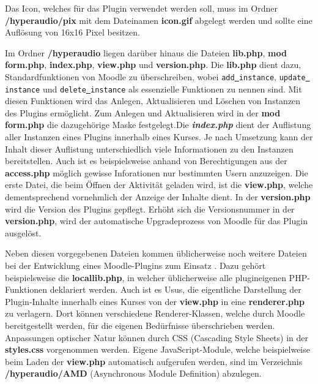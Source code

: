 Das Icon, welches für das Plugin  verwendet werden soll, muss im Ordner \textbf{/hyperaudio/pix} mit dem Dateinamen \textbf{icon.gif} abgelegt werden und sollte eine Auflösung von 16x16 Pixel besitzen.

Im Ordner \textbf{/hyperaudio} liegen darüber hinaus die Dateien \textbf{lib.php}, \textbf{mod\underline{{ }}form.php}, \textbf{index.php}, \textbf{view.php} und \textbf{version.php}. Die \textbf{lib.php} dient dazu, Standardfunktionen von Moodle zu überschreiben, wobei \texttt{add\underline{{ }}instance}, \texttt{update\underline{{ }}instance} und \texttt{delete\underline{{ }}instance} als essenzielle Funktionen zu nennen sind. Mit diesen Funktionen wird das Anlegen, Aktualisieren und Löschen von Instanzen des Plugins ermöglicht. Zum Anlegen und Aktualisieren wird in der \textbf{mod\underline{{ }}form.php} die dazugehörige Maske festgelegt.Die \textbf{\textit{index.php}} dient der Auflistung aller Instanzen eines Plugins innerhalb eines Kurses. Je nach Umsetzung kann der Inhalt dieser Auflistung unterschiedlich viele Informationen zu den Instanzen bereitstellen. Auch ist es beispielsweise anhand von Berechtigungen aus der \textbf{access.php} möglich gewisse Inforationen nur bestimmten Usern anzuzeigen. Die erste Datei, die beim Öffnen der Aktivität geladen wird, ist die \textbf{view.php}, welche dementsprechend vornehmlich der Anzeige der Inhalte dient. In der \textbf{version.php} wird die Version des Plugins gepflegt. Erhöht sich die Versionsnummer in der \textbf{version.php}, wird der automatische Upgradeprozess von Moodle für das Plugin ausgelöst.

Neben diesen vorgegebenen Dateien kommen üblicherweise noch weitere Dateien bei der Entwicklung eines Moodle-Plugins zum Einsatz \citep{wild2017moodle}. Dazu gehört beispielsweise die \textbf{locallib.php}, in welcher üblicherweise alle plugineigenen PHP-Funktionen deklariert werden. Auch ist es Usus, die eigentliche Darstellung der Plugin-Inhalte innerhalb eines Kurses von der \textbf{view.php} in eine \textbf{renderer.php} zu verlagern. Dort können verschiedene Renderer-Klassen, welche durch Moodle bereitgestellt werden, für die eigenen Bedürfnisse überschrieben werden. Anpassungen optischer Natur können durch CSS (Cascading Style Sheets) in der \textbf{styles.css} vorgenommen werden. Eigene JavaScript-Module, welche beispielweise beim Laden der \textbf{view.php} automatisch aufgerufen werden, sind im Verzeichnis \textbf{/hyperaudio/AMD} (Asynchronous Module Definition) abzulegen.

